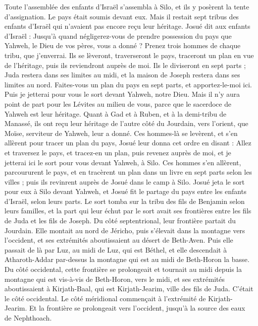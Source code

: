 \begin{multicols}{2}
\VerseOne{}Toute l’assemblée des enfants d’Israël s’assembla à\FTNT{} Silo, et ils y posèrent la tente d’assignation. Le pays était soumis devant eux.
Mais il restait sept tribus des enfants d’Israël qui n’avaient pas encore reçu leur héritage.
Josué dit aux enfants d’Israël : Jusqu’à quand négligerez-vous de prendre possession du pays que Yahweh, le Dieu de vos pères, vous a donné ?
Prenez trois hommes de chaque tribu, que j’enverrai. Ils se lèveront, traverseront le pays, traceront un plan en vue de l’héritage, puis ils reviendront auprès de moi.
Ils le diviseront en sept parts ; Juda restera dans ses limites au midi, et la maison de Joseph restera dans ses limites au nord.
Faites-vous un plan du pays en sept parts, et apportez-le-moi ici. Puis je jetterai pour vous le sort devant Yahweh, notre Dieu.
Mais il n’y aura point de part pour les Lévites au milieu de vous, parce que le sacerdoce de Yahweh est leur héritage. Quant à Gad et à Ruben, et à la demi-tribu de Manassé, ils ont reçu leur héritage de l’autre côté du Jourdain, vers l’orient, que Moïse, serviteur de Yahweh, leur a donné.
Ces hommes-là se levèrent, et s’en allèrent pour tracer un plan du pays, Josué leur donna cet ordre en disant : Allez et traversez le pays, et tracez-en un plan, puis revenez auprès de moi, et je jetterai ici le sort pour vous devant Yahweh, à Silo.
Ces hommes s’en allèrent, parcoururent le pays, et en tracèrent un plan dans un livre en sept parts selon les villes ; puis ils revinrent auprès de Josué dans le camp à Silo.
Josué jeta le sort pour eux à Silo devant Yahweh, et Josué fit le partage du pays entre les enfants d’Israël, selon leurs parts.
Le sort tomba sur la tribu des fils de Benjamin selon leurs familles, et la part qui leur échut par le sort avait ses frontières entre les fils de Juda et les fils de Joseph.
Du côté septentrional, leur frontière partait du Jourdain. Elle montait au nord de Jéricho, puis s’élevait dans la montagne vers l’occident, et ses extrémités aboutissaient au désert de Beth-Aven.
Puis elle passait de là par Luz, au midi de Luz, qui est Béthel, et elle descendait à Atharoth-Addar par-dessus la montagne qui est au midi de Beth-Horon la basse.
Du côté occidental, cette frontière se prolongeait et tournait au midi depuis la montagne qui est vis-à-vis de Beth-Horon, vers le midi, et ses extrémités aboutissaient à Kirjath-Baal, qui est Kirjath-Jearim, ville des fils de Juda. C’était le côté occidental.
Le côté méridional commençait à l’extrémité de Kirjath-Jearim. Et la frontière se prolongeait vers l’occident, jusqu’à la source des eaux de Nephthoach.

\end{multicols}

